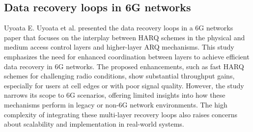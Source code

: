 \documentclass[sn-mathphys-num]{sn-jnl}
\theoremstyle{thmstyleone}
\theoremstyle{thmstyletwo}%
\theoremstyle{thmstylethree}%
\begin{document}
\subsection{Data recovery loops in 6G networks} \label{s2.7}

Uyoata E. Uyoata et al. \cite{r31} presented the data recovery loops in a 6G networks paper that focuses on the interplay between HARQ schemes in the physical and medium access control layers and higher-layer ARQ mechanisms. This study emphasizes the need for enhanced coordination between layers to achieve efficient data recovery in 6G networks. The proposed enhancements, such as fast HARQ schemes for challenging radio conditions, show substantial throughput gains, especially for users at cell edges or with poor signal quality. However, the study narrows its scope to 6G scenarios, offering limited insights into how these mechanisms perform in legacy or non-6G network environments. The high complexity of integrating these multi-layer recovery loops also raises concerns about scalability and implementation in real-world systems.


\setlength{\tabcolsep}{4pt}
\setlength{\extrarowheight}{-2pt} %
\renewcommand{\arraystretch}{0.5}
\end{document}
